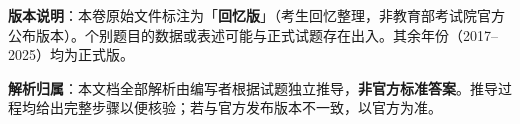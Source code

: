 

\begin{gknotice}
\textbf{版本说明}：本卷原始文件标注为「\textbf{回忆版}」（考生回忆整理，非教育部考试院官方公布版本）。个别题目的数据或表述可能与正式试题存在出入。其余年份（2017–2025）均为正式版。

\textbf{解析归属}：本文档全部解析由编写者根据试题独立推导，\textbf{非官方标准答案}。推导过程均给出完整步骤以便核验；若与官方发布版本不一致，以官方为准。
\end{gknotice}

\par\medskip


